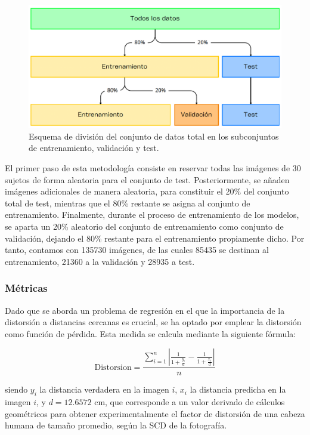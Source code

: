 \begin{figure}[h]
	\centering
	\includegraphics[scale=0.55]{imagenes/cap5/hold-out.png}
	\caption[Esquema de división del conjunto de datos.]{Esquema de división del conjunto de datos total en los subconjuntos de entrenamiento, validación y test.}
	\label{fig27}
\end{figure}

El primer paso de esta metodología consiste en reservar todas las imágenes de 30 sujetos de forma aleatoria para el conjunto de test. Posteriormente, se añaden imágenes adicionales de manera aleatoria, para constituir el 20\% del conjunto total de test, mientras que el 80\% restante se asigna al conjunto de entrenamiento. Finalmente, durante el proceso de entrenamiento de los modelos, se aparta un 20\% aleatorio del conjunto de entrenamiento como conjunto de validación, dejando el 80\% restante para el entrenamiento propiamente dicho. Por tanto, contamos con 135730 imágenes, de las cuales 85435 se destinan al entrenamiento, 21360 a la validación y 28935 a test.


\subsubsection{Métricas}

Dado que se aborda un problema de regresión en el que la importancia de la distorsión a distancias cercanas es crucial, se ha optado por emplear la distorsión como función de pérdida. Esta medida se calcula mediante la siguiente fórmula:

\begin{equation}
	\text{Distorsion} = \displaystyle \frac{\sum_{i=1}^{n} | \displaystyle \frac{1}{1 + \displaystyle \frac{y_i}{d}} - \displaystyle \frac{1}{1 + \displaystyle \frac{x_i}{d}}|}{n}
\end{equation}

siendo $y_i$ la distancia verdadera en la imagen $i$, $x_i$ la distancia predicha en la imagen $i$, y $d = 12.6572 $ cm, que corresponde a un valor derivado de cálculos geométricos \cite{55} para obtener experimentalmente el factor de distorsión de una cabeza humana de tamaño promedio, según la SCD de la fotografía.

